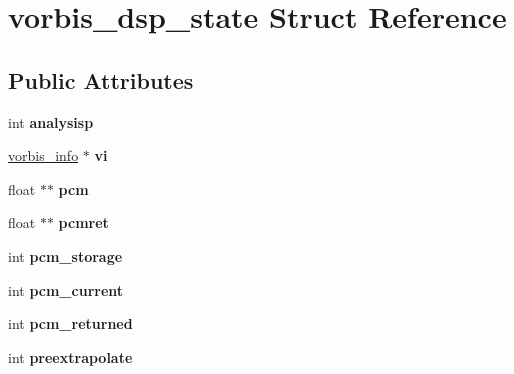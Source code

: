 \hypertarget{structvorbis__dsp__state}{
\section{vorbis\_\-dsp\_\-state Struct Reference}
\label{structvorbis__dsp__state}
}
\subsection*{Public Attributes}
\begin{DoxyCompactItemize}
\item 
\hypertarget{structvorbis__dsp__state_a9b983a6901a311f2d354f2b6c51cf93b}{
int {\bfseries analysisp}}
\label{structvorbis__dsp__state_a9b983a6901a311f2d354f2b6c51cf93b}

\item 
\hypertarget{structvorbis__dsp__state_ab6819a31e79031cdcd8f2ff40a5c1def}{
\hyperlink{structvorbis__info}{vorbis\_\-info} $\ast$ {\bfseries vi}}
\label{structvorbis__dsp__state_ab6819a31e79031cdcd8f2ff40a5c1def}

\item 
\hypertarget{structvorbis__dsp__state_ab33bafd2638e5bea5737709feea89027}{
float $\ast$$\ast$ {\bfseries pcm}}
\label{structvorbis__dsp__state_ab33bafd2638e5bea5737709feea89027}

\item 
\hypertarget{structvorbis__dsp__state_ab2c2a87593f0d7a3c867ba80102c4260}{
float $\ast$$\ast$ {\bfseries pcmret}}
\label{structvorbis__dsp__state_ab2c2a87593f0d7a3c867ba80102c4260}

\item 
\hypertarget{structvorbis__dsp__state_a33cf1637859094c31429dace6dfc79e2}{
int {\bfseries pcm\_\-storage}}
\label{structvorbis__dsp__state_a33cf1637859094c31429dace6dfc79e2}

\item 
\hypertarget{structvorbis__dsp__state_a6d09bbf3927e337d721b05f669bd70c6}{
int {\bfseries pcm\_\-current}}
\label{structvorbis__dsp__state_a6d09bbf3927e337d721b05f669bd70c6}

\item 
\hypertarget{structvorbis__dsp__state_a8db33e5f4c0b7f31f218c9ff6ccd7ac3}{
int {\bfseries pcm\_\-returned}}
\label{structvorbis__dsp__state_a8db33e5f4c0b7f31f218c9ff6ccd7ac3}

\item 
\hypertarget{structvorbis__dsp__state_aecc3c42d23d876c8bfd396b5c2ac5eb6}{
int {\bfseries preextrapolate}}
\label{structvorbis__dsp__state_aecc3c42d23d876c8bfd396b5c2ac5eb6}


\end{DoxyCompactItemize}
